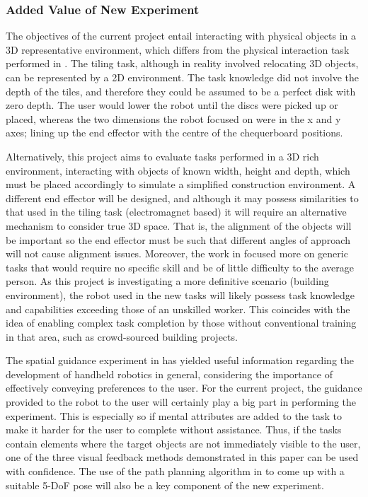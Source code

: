 \documentclass[11pt]{article}
\begin{document}
\subsubsection{Added Value of New Experiment}
The objectives of the current project entail interacting with physical objects in a 3D representative environment, which differs from the physical interaction task performed in \cite{GreggSmithDesign}. The tiling task, although in reality involved relocating 3D objects, can be represented by a 2D environment. The task knowledge did not involve the depth of the tiles, and therefore they could be assumed to be a perfect disk with zero depth. The user would lower the robot until the discs were picked up or placed, whereas the two dimensions the robot focused on were in the x and y axes; lining up the end effector with the centre of the chequerboard positions.

Alternatively, this project aims to evaluate tasks performed in a 3D rich environment, interacting with objects of known width, height and depth, which must be placed accordingly to simulate a simplified construction environment. A different end effector will be designed, and although it may possess similarities to that used in the tiling task (electromagnet based) it will require an alternative mechanism to consider true 3D space. That is, the alignment of the objects will be important so the end effector must be such that different angles of approach will not cause alignment issues. Moreover, the work in \cite{GreggSmithDesign} focused more on generic tasks that would require no specific skill and be of little difficulty to the average person. As this project is investigating a more definitive scenario (building environment), the robot used in the new tasks will likely possess task knowledge and capabilities exceeding those of an unskilled worker. This coincides with the idea of enabling complex task completion by those without conventional training in that area, such as crowd-sourced building projects.

The spatial guidance experiment in \cite{GreggSmithFeedback} has yielded useful information regarding the development of handheld robotics in general, considering the importance of effectively conveying preferences to the user. For the current project, the guidance provided to the robot to the user will certainly play a big part in performing the experiment. This is especially so if mental attributes are added to the task to make it harder for the user to complete without assistance. Thus, if the tasks contain elements where the target objects are not immediately visible to the user, one of the three visual feedback methods demonstrated in this paper can be used with confidence. The use of the path planning algorithm in \cite{GreggSmithFeedback} to come up with a suitable 5-DoF pose will also be a key component of the new experiment.
\end{document}
